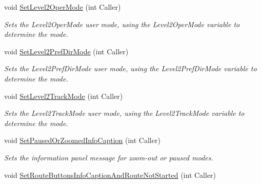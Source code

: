 \begin{DoxyCompactItemize}
\mbox{\label{class_t_interface_ab6dd4ad69783b6f16a8bdc2eb7dfe512}} 
void \mbox{\hyperlink{class_t_interface_ab6dd4ad69783b6f16a8bdc2eb7dfe512}{Set\+Level2\+Oper\+Mode}} (int Caller)
\begin{DoxyCompactList}\small\item\em Sets the Level2\+Oper\+Mode user mode, using the Level2\+Oper\+Mode variable to determine the mode. \end{DoxyCompactList}\item 
\mbox{\label{class_t_interface_af01b649aa75f881cbfd2f14a60533bcc}} 
void \mbox{\hyperlink{class_t_interface_af01b649aa75f881cbfd2f14a60533bcc}{Set\+Level2\+Pref\+Dir\+Mode}} (int Caller)
\begin{DoxyCompactList}\small\item\em Sets the Level2\+Pref\+Dir\+Mode user mode, using the Level2\+Pref\+Dir\+Mode variable to determine the mode. \end{DoxyCompactList}\item 
\mbox{\label{class_t_interface_a19ee788122a66d7e97873159bf2e4e4b}} 
void \mbox{\hyperlink{class_t_interface_a19ee788122a66d7e97873159bf2e4e4b}{Set\+Level2\+Track\+Mode}} (int Caller)
\begin{DoxyCompactList}\small\item\em Sets the Level2\+Track\+Mode user mode, using the Level2\+Track\+Mode variable to determine the mode. \end{DoxyCompactList}\item 
\mbox{\label{class_t_interface_ac24842680583df5ef46f3ece3bc76bb3}} 
void \mbox{\hyperlink{class_t_interface_ac24842680583df5ef46f3ece3bc76bb3}{Set\+Paused\+Or\+Zoomed\+Info\+Caption}} (int Caller)
\begin{DoxyCompactList}\small\item\em Sets the information panel message for zoom-\/out or paused modes. \end{DoxyCompactList}\item 
void \mbox{\hyperlink{class_t_interface_a89cc1839f77c2a867714cb52bd8d5cfe}{Set\+Route\+Buttons\+Info\+Caption\+And\+Route\+Not\+Started}} (int Caller)
\item 
\mbox{\label{class_t_interface_afeb3a4236e5cfa7e93d7d5167304f937}} 

\end{DoxyCompactItemize}
